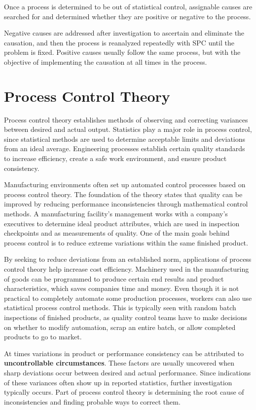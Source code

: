 \documentclass[12pt]{article}
\begin{document}
Once a process is determined to be out of statistical control, assignable causes are searched for and determined whether they are positive or negative to the process.


Negative causes are addressed after investigation to ascertain and eliminate the causation, and then the process is reanalyzed repeatedly with SPC until the problem is fixed. Positive causes usually follow the same process, but with the objective of implementing the causation at all times in the process.

\newpage
\section{Process Control Theory}

Process control theory establishes methods of observing and correcting variances between desired and actual output. Statistics play a major role in process control, since statistical methods are used to determine acceptable limits and deviations from an ideal average. Engineering processes establish certain quality standards to increase efficiency, create a safe work environment, and ensure product consistency.

Manufacturing environments often set up automated control processes based on process control theory. The foundation of the theory states that quality can be improved by reducing performance inconsistencies through mathematical control methods. A manufacturing facility's management works with a company's executives to determine ideal product attributes, which are used in inspection checkpoints and as measurements of quality. One of the main goals behind process control is to reduce extreme variations within the same finished product.

By seeking to reduce deviations from an established norm, applications of process control theory help increase cost efficiency. Machinery used in the manufacturing of goods can be programmed to produce certain end results and product characteristics, which saves companies time and money. Even though it is not practical to completely automate some production processes, workers can also use statistical process control methods. This is typically seen with random batch inspections of finished products, as quality control teams have to make decisions on whether to modify automation, scrap an entire batch, or allow completed products to go to market.

At times variations in product or performance consistency can be attributed to \textbf{uncontrollable circumstances}. These factors are usually uncovered when sharp deviations occur between desired and actual performance. Since indications of these variances often show up in reported statistics, further investigation typically occurs. Part of process control theory is determining the root cause of inconsistencies and finding probable ways to correct them.
\end{document}
